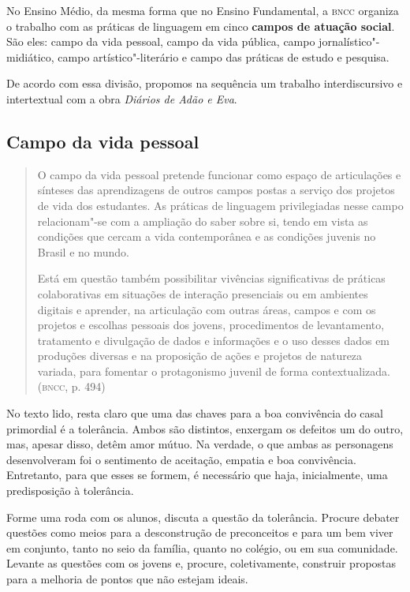 \documentclass[12pt]{extarticle}
\begin{document}
No Ensino Médio, da mesma forma que no Ensino Fundamental, a \textsc{bncc}
organiza o trabalho com as práticas de linguagem em cinco \textbf{campos
de atuação social}. São eles: campo da vida pessoal, campo da vida
pública, campo jornalístico"-midiático, campo artístico"-literário e campo
das práticas de estudo e pesquisa.

De acordo com essa divisão, propomos na sequência um trabalho
interdiscursivo e intertextual com a obra \emph{Diários de Adão e Eva}.

\subsection{Campo da vida pessoal}

\begin{quote}
O campo da vida pessoal pretende funcionar como espaço de articulações
e sínteses das aprendizagens de outros campos postas a serviço dos
projetos de vida dos estudantes. As práticas de linguagem privilegiadas
nesse campo relacionam"-se com a ampliação do saber sobre si, tendo em
vista as condições que cercam a vida contemporânea e as condições
juvenis no Brasil e no mundo.

Está em questão também possibilitar vivências significativas de práticas
colaborativas em situações de interação presenciais ou em ambientes
digitais e aprender, na articulação com outras áreas, campos e com os
projetos e escolhas pessoais dos jovens, procedimentos de levantamento,
tratamento e divulgação de dados e informações e o uso desses dados em
produções diversas e na proposição de ações e projetos de natureza
variada, para fomentar o protagonismo juvenil de forma
contextualizada. (\textsc{bncc}, p. 494)
\end{quote}


No texto lido, resta claro que uma das chaves para a boa convivência
do casal primordial é a tolerância. Ambos são distintos, enxergam os
defeitos um do outro, mas, apesar disso, detêm amor mútuo. Na verdade,
o que ambas as personagens desenvolveram foi o sentimento de
aceitação, empatia e boa convivência. Entretanto, para que esses se
formem, é necessário que haja, inicialmente, uma predisposição à
tolerância.

Forme uma roda com os alunos, discuta a questão da tolerância. Procure
debater questões como meios para a desconstrução de preconceitos e para
um bem viver em conjunto, tanto no seio da família, quanto no colégio,
ou em sua comunidade. Levante as questões com os jovens e, procure,
coletivamente, construir propostas para a melhoria de pontos que não
estejam ideais.
\end{document}
